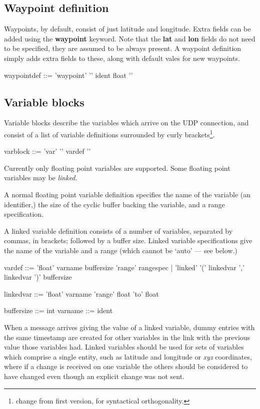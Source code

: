 \subsection{Waypoint definition}
\label{waypointdef}
Waypoints, by default, consist of just latitude and longitude. Extra
fields can be added using the \textbf{waypoint} keyword. Note that
the \textbf{lat} and \textbf{lon} fields do not need to be specified,
they are assumed to be always present. A waypoint definition simply adds
extra fields to these, along with default vales for new waypoints.
\begin{v}
waypointdef ::= 'waypoint' '{' {ident float} '}'
\end{v}


\subsection{Variable blocks}
Variable blocks describe the variables which arrive on the UDP
connection, and consist of a list of variable definitions surrounded
by curly brackets\footnote{change from first version, for syntactical orthogonality.}.
\begin{v}
varblock    ::= 'var' '{' {vardef} '}'
\end{v}
Currently only floating point variables are supported.
Some floating point variables may be \emph{linked.}

A normal floating point variable definition specifies the name of the variable
(an identifier,) the size of the cyclic buffer backing the variable,
and a range specification.

A linked variable definition consists of a number of variables,
separated by commas, in brackets; followed by a buffer size.
Linked variable specifications give the name of the variable and
a range (which cannot be `auto' --- see below.)
\begin{v}
vardef      ::= 'float' varname buffersize 'range' rangespec
            |   'linked' '(' { linkedvar ',' } linkedvar ')' buffersize

linkedvar   ::= 'float' varname 'range' float 'to' float

buffersize  ::= int
varname     ::= ident
            
\end{v}
When a message arrives giving the value of a linked variable, dummy
entries with the same timestamp are created for other variables
in the link with the previous value those variables had. Linked
variables should be used for sets of variables which comprise a single
entity, such as latitude and longitude or \emph{xyz} coordinates,
where if a change is received on one variable the others should be
considered to have changed even though an explicit change was not
sent.


